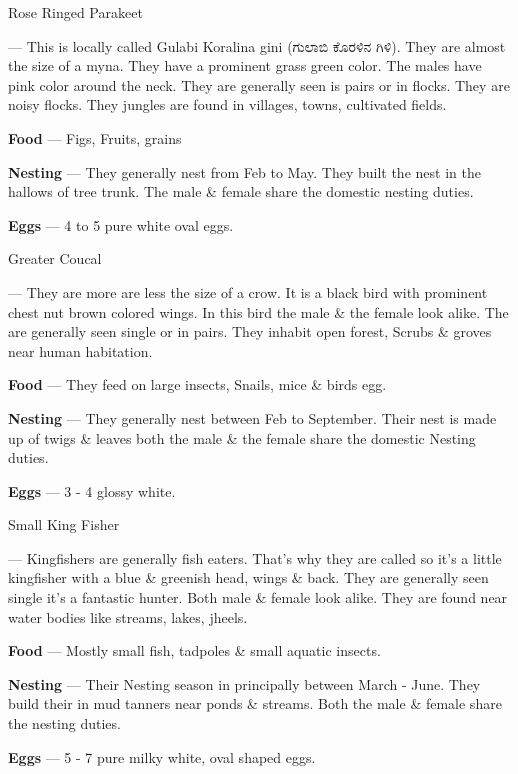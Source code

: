 \begin{bird}{Rose Ringed Parakeet}

 --- This is locally called Gulabi Koralina gini ({\kan ಗುಲಾಬಿ ಕೊರಳಿನ ಗಿಳಿ}). They are almost the size of a myna. They have a prominent grass green color. The males have pink color around the neck. They are generally seen is pairs or in flocks. They are noisy flocks. They jungles are found in villages, towns, cultivated fields.

{\large\bf Food} --- Figs, Fruits, grains 

{\large\bf Nesting} --- They generally nest from Feb to May. They built the nest in the hallows of tree trunk. The male \& female share the domestic nesting duties.

{\large\bf Eggs} --- 4 to 5 pure white oval eggs.
\end{bird}

\begin{bird}{Greater Coucal}

 --- They are more are less the size of a crow. It is a black bird with prominent chest nut brown colored wings. In this bird the male \& the female look alike. The are generally seen single or in pairs. They inhabit open forest, Scrubs \& groves near human habitation. 

{\large\bf Food} --- They feed on large insects, Snails, mice \& birds egg.

{\large\bf Nesting} --- They generally nest between Feb to September. Their nest is made up of twigs \& leaves both the male \& the female share the domestic Nesting duties.

{\large\bf Eggs} --- 3 - 4 glossy white.
\end{bird}

\begin{bird}{Small King Fisher}

 --- Kingfishers are generally fish eaters. That's why they are called so it's a little kingfisher with a blue \& greenish head, wings \& back. They are generally seen single it's a fantastic hunter. Both male \& female look alike. They are found near water bodies like streams, lakes, jheels.

{\large\bf Food} --- Mostly small fish, tadpoles \& small aquatic insects.

{\large\bf Nesting} --- Their Nesting season in principally between March - June. They build their in mud tanners near ponds \& streams. Both the male \& female share the nesting duties.

{\large\bf Eggs} --- 5 - 7 pure milky white, oval shaped eggs.
\end{bird}

